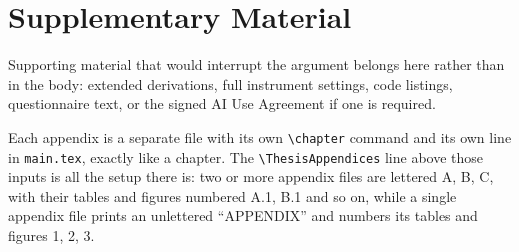 %
%
\ThesisSectionsOnly

\section{Supplementary Material}

Supporting material that would interrupt the argument belongs here rather than
in the body: extended derivations, full instrument settings, code listings,
questionnaire text, or the signed AI Use Agreement if one is required.

Each appendix is a separate file with its own \verb|\chapter| command and its
own \verb|| line in \verb|main.tex|, exactly like a chapter. The
\verb|\ThesisAppendices| line above those inputs is all the setup there is:
two or more appendix files are lettered A, B, C, with their tables and figures
numbered A.1, B.1 and so on, while a single appendix file prints an unlettered
``APPENDIX'' and numbers its tables and figures 1, 2, 3.

